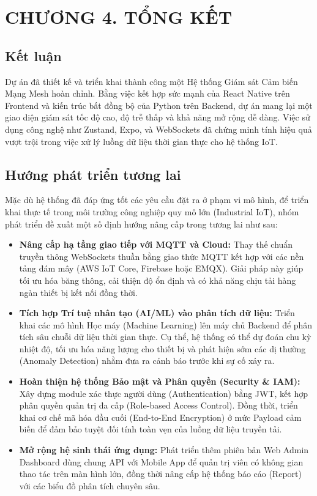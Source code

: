 \documentclass{article}
\begin{document}
\newpage

\section*{CHƯƠNG 4. TỔNG KẾT}
\setcounter{section}{4}
\setcounter{subsection}{0}

\subsection{Kết luận}
Dự án đã thiết kế và triển khai thành công một Hệ thống Giám sát Cảm biến Mạng Mesh hoàn chỉnh. Bằng việc kết hợp sức mạnh của React Native trên Frontend và kiến trúc bất đồng bộ của Python trên Backend, dự án mang lại một giao diện giám sát tốc độ cao, độ trễ thấp và khả năng mở rộng dễ dàng. Việc sử dụng công nghệ như Zustand, Expo, và WebSockets đã chứng minh tính hiệu quả vượt trội trong việc xử lý luồng dữ liệu thời gian thực cho hệ thống IoT.

\subsection{Hướng phát triển tương lai}
Mặc dù hệ thống đã đáp ứng tốt các yêu cầu đặt ra ở phạm vi mô hình, để triển khai thực tế trong môi trường công nghiệp quy mô lớn (Industrial IoT), nhóm phát triển đề xuất một số định hướng nâng cấp trong tương lai như sau:

\begin{itemize}
    \item \textbf{Nâng cấp hạ tầng giao tiếp với MQTT và Cloud:} 
    Thay thế chuẩn truyền thông WebSockets thuần bằng giao thức MQTT kết hợp với các nền tảng đám mây (AWS IoT Core, Firebase hoặc EMQX). Giải pháp này giúp tối ưu hóa băng thông, cải thiện độ ổn định và có khả năng chịu tải hàng ngàn thiết bị kết nối đồng thời.

    \item \textbf{Tích hợp Trí tuệ nhân tạo (AI/ML) vào phân tích dữ liệu:} 
    Triển khai các mô hình Học máy (Machine Learning) lên máy chủ Backend để phân tích sâu chuỗi dữ liệu thời gian thực. Cụ thể, hệ thống có thể dự đoán chu kỳ nhiệt độ, tối ưu hóa năng lượng cho thiết bị và phát hiện sớm các dị thường (Anomaly Detection) nhằm đưa ra cảnh báo trước khi sự cố xảy ra.

    \item \textbf{Hoàn thiện hệ thống Bảo mật và Phân quyền (Security \& IAM):} 
    Xây dựng module xác thực người dùng (Authentication) bằng JWT, kết hợp phân quyền quản trị đa cấp (Role-based Access Control). Đồng thời, triển khai cơ chế mã hóa đầu cuối (End-to-End Encryption) ở mức Payload cảm biến để đảm bảo tuyệt đối tính toàn vẹn của luồng dữ liệu truyền tải.
    
    \item \textbf{Mở rộng hệ sinh thái ứng dụng:} 
    Phát triển thêm phiên bản Web Admin Dashboard dùng chung API với Mobile App để quản trị viên có không gian thao tác trên màn hình lớn, đồng thời nâng cấp hệ thống báo cáo (Report) với các biểu đồ phân tích chuyên sâu.
\end{itemize}
\end{document}
